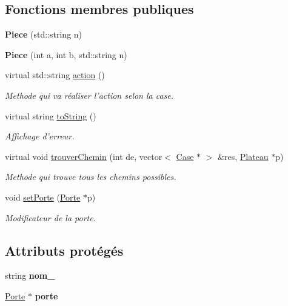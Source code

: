 \subsection*{\-Fonctions membres publiques}
\begin{DoxyCompactItemize}
\item 
\hypertarget{classPiece_a81b2270c38239330249ed0e3188071ce}{{\bfseries \-Piece} (std\-::string n)}\label{classPiece_a81b2270c38239330249ed0e3188071ce}

\item 
\hypertarget{classPiece_a853e5114a396a009ff046af8e3ba6f5b}{{\bfseries \-Piece} (int a, int b, std\-::string n)}\label{classPiece_a853e5114a396a009ff046af8e3ba6f5b}

\item 
virtual std\-::string \hyperlink{classPiece_ae2bbb51808f5d87be1761df503571e0d}{action} ()
\begin{DoxyCompactList}\small\item\em \-Methode qui va réaliser l'action selon la case. \end{DoxyCompactList}\item 
\hypertarget{classPiece_ae18523c400cb72a50bb1293d27cd1432}{virtual string \hyperlink{classPiece_ae18523c400cb72a50bb1293d27cd1432}{to\-String} ()}\label{classPiece_ae18523c400cb72a50bb1293d27cd1432}

\begin{DoxyCompactList}\small\item\em \-Affichage d'erreur. \end{DoxyCompactList}\item 
virtual void \hyperlink{classPiece_ab8f478c95ba4d853c9016d19211e2be1}{trouver\-Chemin} (int de, vector$<$ \hyperlink{classCase}{\-Case} $\ast$ $>$ \&res, \hyperlink{classPlateau}{\-Plateau} $\ast$p)
\begin{DoxyCompactList}\small\item\em \-Methode qui trouve tous les chemins possibles. \end{DoxyCompactList}\item 
void \hyperlink{classPiece_afd9fcbb17752f925bd3104acbf271190}{set\-Porte} (\hyperlink{classPorte}{\-Porte} $\ast$p)
\begin{DoxyCompactList}\small\item\em \-Modificateur de la porte. \end{DoxyCompactList}\end{DoxyCompactItemize}
\subsection*{\-Attributs protégés}
\begin{DoxyCompactItemize}
\item 
\hypertarget{classPiece_ad6f31cca0e9343e1ea56cfaf990f3f1e}{string {\bfseries nom\-\_\-}}\label{classPiece_ad6f31cca0e9343e1ea56cfaf990f3f1e}

\item 
\hypertarget{classPiece_ab75a6524350e4e783f7f4980d47e9e02}{\hyperlink{classPorte}{\-Porte} $\ast$ {\bfseries porte}}\label{classPiece_ab75a6524350e4e783f7f4980d47e9e02}

\end{DoxyCompactItemize}


